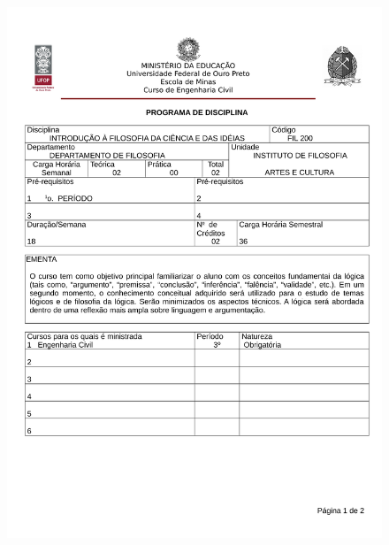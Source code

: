 \begin{figure}[p]
	\centering 
	\includegraphics[scale=0.7]{capitulos/anexo1-programas-disciplina/eg310.pdf}
\end{figure}

